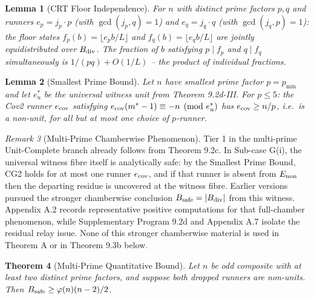 \documentclass[11pt,a4paper]{article}
\theoremstyle{plain}
\newtheorem{theorem}{Theorem}[section]
\newtheorem{lemma}[theorem]{Lemma}
\theoremstyle{definition}
\theoremstyle{remark}
\newtheorem{remark}[theorem]{Remark}
\begin{document}
\begin{lemma}[CRT Floor Independence]
For $n$ with distinct prime factors $p,q$ and runners $e_p = j_p \cdot p$ (with $\gcd(j_p, q) = 1$) and $e_q = j_q \cdot q$ (with $\gcd(j_q, p) = 1$): the floor states $f_p(b) = \lfloor e_p b/L \rfloor$ and $f_q(b) = \lfloor e_q b/L \rfloor$ are jointly equidistributed over $B_{\rm div}$. The fraction of $b$ satisfying $p \mid f_p$ and $q \mid f_q$ simultaneously is $1/(pq) + O(1/L)$ -- the product of individual fractions.

\end{lemma}


\begin{lemma}[Smallest Prime Bound]
Let $n$ have smallest prime factor $p = p_{\min}$ and let $e_u^*$ be the universal witness unit from Theorem 9.2d-III. For $p \leq 5$: the Cov2 runner $e_{\rm cov}$ satisfying $e_{\rm cov}(m^*-1) \equiv -n \pmod{e_u^*}$ has $e_{\rm cov} \geq n/p$, i.e.\ is a non-unit, for all but at most one choice of $p$-runner.

\end{lemma}


\begin{remark}[Multi-Prime Chamberwise Phenomenon]
Tier 1 in the multi-prime Unit-Complete branch already follows from Theorem 9.2c. In Sub-case G(i), the universal witness fibre itself is analytically safe: by the Smallest Prime Bound, CG2 holds for at most one runner $e_{\rm cov}$, and if that runner is absent from $E_{\rm non}$ then the departing residue is uncovered at the witness fibre. Earlier versions pursued the stronger chamberwise conclusion $B_{\rm safe} = |B_{\rm div}|$ from this witness. Appendix A.2 records representative positive computations for that full-chamber phenomenon, while Supplementary Program 9.2d and Appendix A.7 isolate the residual relay issue. None of this stronger chamberwise material is used in Theorem A or in Theorem 9.3b below.

\end{remark}


\begin{theorem}[Multi-Prime Quantitative Bound]
Let $n$ be odd composite with at least two distinct prime factors, and suppose both dropped runners are non-units. Then $B_{\rm safe} \geq \varphi(n)(n-2)/2$.

\end{theorem}
\end{document}
